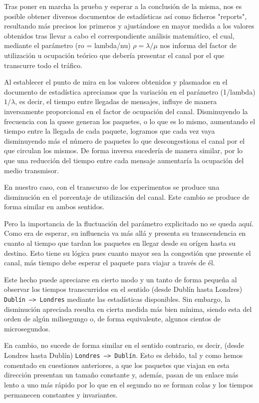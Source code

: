 \documentclass{article}[10pt]
\begin{document}
		Tras poner en marcha la prueba y esperar a la conclusión de la misma, nos es posible obtener diversos documentos de estadísticas así como ficheros "reports", resultando más precisos los primeros y ajustándose en mayor medida a los valores obtenidos tras llevar a cabo el correspondiente análisis matemático, el cual, mediante el parámetro (ro = lambda/nu) $\rho = \lambda/\mu$ nos informa del factor de utilización u ocupación teórico que debería presentar el canal por el que transcurre todo el tráfico.

		Al establecer el punto de mira en los valores obtenidos y plasmados en el documento de estadística apreciamos que la variación en el parámetro (1/lambda) $1/\lambda$, es decir, el tiempo entre llegadas de mensajes, influye de manera inversamente proporcional en el factor de ocupación del canal. Disminuyendo la frecuencia con la quese generan los paquetes, o lo que es lo mismo, aumentando el tiempo entre la llegada de cada paquete, logramos que cada vez vaya disminuyendo más el número de paquetes lo que descongestiona el canal por el que circulan los mismos. De forma inversa sucedería de manera similar, por lo que una reducción del tiempo entre cada mensaje aumentaría la ocupación del medio transmisor.

		En nuestro caso, con el transcurso de los experimentos se produce una disminución en el porcentaje de utilización del canal. Este cambio se produce de forma similar en ambos sentidos.

		Pero la importancia de la fluctuación del parámetro explicitado no se queda aquí. Como era de esperar, su influencia va más allá y presenta su transcendencia en cuanto al tiempo que tardan los paquetes en llegar desde su orígen hasta su destino. Esto tiene su lógica pues cuanto mayor sea la congestión que presente el canal, más tiempo debe esperar el paquete para viajar a través de él.

		Este hecho puede apreciarse en cierto modo y un tanto de forma pequeña al observar los tiempos transcurridos en el sentido (desde Dublín hasta Londres) \texttt{Dublín --> Londres} mediante las estadísticas disponibles. Sin embargo, la disminución apreciada resulta en cierta medida más bien mínima, siendo esta del orden de algún milisegungo o, de forma equivalente, algunos cientos de microsegundos.

		En cambio, no sucede de forma similar en el sentido contrario, es decir, (desde Londres hasta Dublín) \texttt{Londres --> Dublín}. Esto es debido, tal y como hemos comentado en cuestiones anteriores, a que los paquetes que viajan en esta dirección presentan un tamaño constante y, además, pasan de un enlace más lento a uno más rápido por lo que en el segundo no se forman colas y los tiempos permanecen constantes y invariantes.
\end{document}
